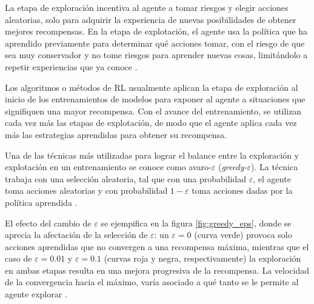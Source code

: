 La etapa de exploración incentiva al agente a tomar riesgos y elegir acciones aleatorias, solo para adquirir la experiencia de nuevas posibilidades de obtener mejores recompensas. En la etapa de explotación, el agente usa la política que ha aprendido previamente para determinar qué acciones tomar, con el riesgo de que sea muy conservador y no tome riesgos para aprender nuevas cosas, limitándolo a repetir experiencias que ya conoce \cite{RLIntro}. 

Los algoritmos o métodos de RL usualmente aplican la etapa de exploración al inicio de los entrenamientos de modelos para exponer al agente a situaciones que signifiquen una mayor recompensa. Con el avance del entrenamiento, se utilizan cada vez más las etapas de explotación, de modo que el agente aplica cada vez más las estrategias aprendidas para obtener su recompensa.

Una de las técnicas más utilizadas para lograr el balance entre la exploración y explotación en un entrenamiento se conoce como avaro-$\varepsilon$ (\textit{greedy-$\varepsilon$}). La técnica trabaja con una selección aleatoria, tal que con una probabilidad $\varepsilon$, el agente toma acciones aleatorias y con probabilidad $1-\varepsilon$ toma acciones dadas por la política aprendida \cite{RLIntro}.

El efecto del cambio de $\varepsilon$ se ejempifica en la figura \ref{fig:greedy_eps}, donde se aprecia la afectación de la selección de $\varepsilon$: un $\varepsilon=0$ (curva verde) provoca solo acciones aprendidas que no convergen a una recompensa máxima, mientras que el caso de $\varepsilon = 0.01$ y $\varepsilon = 0.1$ (curvas roja y negra, respectivamente) la exploración en ambas etapas resulta en una mejora progresiva de la recompensa. La velocidad de la convergencia hacia el máximo, varía asociado a qué tanto se le permite al agente explorar \cite{RLIntro}.


